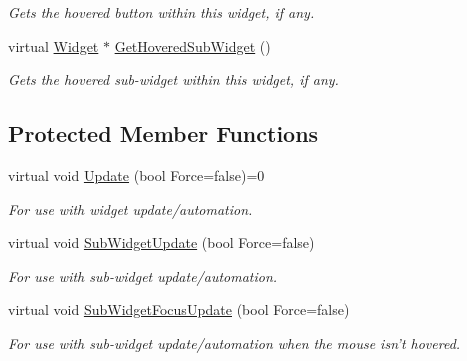 \begin{DoxyCompactItemize}
\begin{DoxyCompactList}\small\item\em Gets the hovered button within this widget, if any. \item\end{DoxyCompactList}\item 
virtual \hyperlink{classphys_1_1UI_1_1Widget}{Widget} $\ast$ \hyperlink{classphys_1_1UI_1_1Widget_a38764b73bc6087e2611660735840ba3f}{GetHoveredSubWidget} ()
\begin{DoxyCompactList}\small\item\em Gets the hovered sub-\/widget within this widget, if any. \item\end{DoxyCompactList}\end{DoxyCompactItemize}
\subsection*{Protected Member Functions}
\begin{DoxyCompactItemize}
\item 
\hypertarget{classphys_1_1UI_1_1Widget_a1806425fcd684c2f0d50cd0ef4a6b0da}{
virtual void \hyperlink{classphys_1_1UI_1_1Widget_a1806425fcd684c2f0d50cd0ef4a6b0da}{Update} (bool Force=false)=0}
\label{d9/d48/classphys_1_1UI_1_1Widget_a1806425fcd684c2f0d50cd0ef4a6b0da}

\begin{DoxyCompactList}\small\item\em For use with widget update/automation. \item\end{DoxyCompactList}\item 
\hypertarget{classphys_1_1UI_1_1Widget_a3472e5d0f8281e704d67d419980cd918}{
virtual void \hyperlink{classphys_1_1UI_1_1Widget_a3472e5d0f8281e704d67d419980cd918}{SubWidgetUpdate} (bool Force=false)}
\label{d9/d48/classphys_1_1UI_1_1Widget_a3472e5d0f8281e704d67d419980cd918}

\begin{DoxyCompactList}\small\item\em For use with sub-\/widget update/automation. \item\end{DoxyCompactList}\item 
\hypertarget{classphys_1_1UI_1_1Widget_a4a7e18c48a7cd230fd4a0aa274c6a654}{
virtual void \hyperlink{classphys_1_1UI_1_1Widget_a4a7e18c48a7cd230fd4a0aa274c6a654}{SubWidgetFocusUpdate} (bool Force=false)}
\label{d9/d48/classphys_1_1UI_1_1Widget_a4a7e18c48a7cd230fd4a0aa274c6a654}

\begin{DoxyCompactList}\small\item\em For use with sub-\/widget update/automation when the mouse isn't hovered. \item\end{DoxyCompactList}\end{DoxyCompactItemize}

